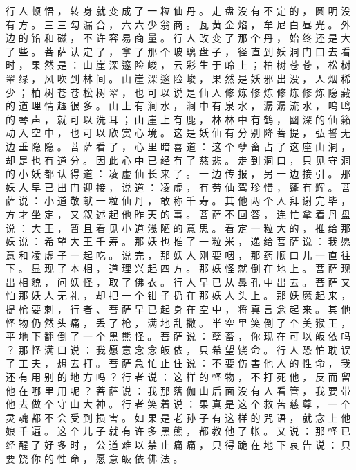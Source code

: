{行 人 顿 悟 ， 转 身 就 变 成 了 一 粒 仙 丹 。 走 盘 没 有 不 定 的 ， 圆 明 没 有 方 。
三 三 勾 漏 合 ， 六 六 少 翁 商 。
瓦 黄 金 焰 ， 牟 尼 白 昼 光 。
外 边 的 铅 和 磁 ， 不 许 容 易 商 量 。
行 人 改 变 了 那 个 丹 ， 始 终 还 是 大 了 些 。
菩 萨 认 定 了 ， 拿 了 那 个 玻 璃 盘 子 ， 径 直 到 妖 洞 门 口 去 看 时 ， 果 然 是 ： 山 崖 深 邃 险 峻 ， 云 彩 生 于 岭 上 ； 柏 树 苍 苍 ， 松 树 翠 绿 ， 风 吹 到 林 间 。
山 崖 深 邃 险 峻 ， 果 然 是 妖 邪 出 没 ， 人 烟 稀 少 ； 柏 树 苍 苍 松 树 翠 ， 也 可 以 说 是 仙 人 修 炼 修 炼 修 炼 修 炼 隐 藏 的 道 理 情 趣 很 多 。
山 上 有 涧 水 ， 涧 中 有 泉 水 ， 潺 潺 流 水 ， 呜 鸣 的 琴 声 ， 就 可 以 洗 耳 ； 山 崖 上 有 鹿 ， 林 林 中 有 鹤 ， 幽 深 的 仙 籁 动 入 空 中 ， 也 可 以 欣 赏 心 境 。
这 是 妖 仙 有 分 别 降 菩 提 ， 弘 誓 无 边 垂 隐 隐 。
菩 萨 看 了 ， 心 里 暗 喜 道 ： 这 个 孽 畜 占 了 这 座 山 洞 ， 却 是 也 有 道 分 。
因 此 心 中 已 经 有 了 慈 悲 。
走 到 洞 口 ， 只 见 守 洞 的 小 妖 都 认 得 道 ： 凌 虚 仙 长 来 了 。
一 边 传 报 ， 另 一 边 接 引 。
那 妖 人 早 已 出 门 迎 接 ， 说 道 ： 凌 虚 ， 有 劳 仙 驾 珍 惜 ， 蓬 有 辉 。
菩 萨 说 ： 小 道 敬 献 一 粒 仙 丹 ， 敢 称 千 寿 。
其 他 两 个 人 拜 谢 完 毕 ， 方 才 坐 定 ， 又 叙 述 起 他 昨 天 的 事 。
菩 萨 不 回 答 ， 连 忙 拿 着 丹 盘 说 ： 大 王 ， 暂 且 看 见 小 道 浅 陋 的 意 思 。
看 定 一 粒 大 的 ， 推 给 那 妖 说 ： 希 望 大 王 千 寿 。
那 妖 也 推 了 一 粒 米 ， 递 给 菩 萨 说 ： 我 愿 意 和 凌 虚 子 一 起 吃 。
说 完 ， 那 妖 人 刚 要 咽 ， 那 药 顺 口 儿 一 直 往 下 。
显 现 了 本 相 ， 道 理 兴 起 四 方 。
那 妖 怪 就 倒 在 地 上 。
菩 萨 现 出 相 貌 ， 问 妖 怪 ， 取 了 佛 衣 。
行 人 早 已 从 鼻 孔 中 出 去 。
菩 萨 又 怕 那 妖 人 无 礼 ， 却 把 一 个 钳 子 扔 在 那 妖 人 头 上 。
那 妖 魔 起 来 ， 提 枪 要 刺 ， 行 者 、 菩 萨 早 已 起 身 在 空 中 ， 将 真 言 念 起 来 。
其 他 怪 物 仍 然 头 痛 ， 丢 了 枪 ， 满 地 乱 撒 。
半 空 里 笑 倒 了 个 美 猴 王 ， 平 地 下 翻 倒 了 一 个 黑 熊 怪 。
菩 萨 说 ： 孽 畜 ， 你 现 在 可 以 皈 依 吗 ？ 那 怪 满 口 说 ： 我 愿 意 念 念 皈 依 ， 只 希 望 饶 命 。
行 人 恐 怕 耽 误 了 工 夫 ， 想 去 打 。
菩 萨 急 忙 止 住 说 ： 不 要 伤 害 他 人 的 性 命 ， 我 还 有 用 别 的 地 方 吗 ？
行 者 说 ： 这 样 的 怪 物 ， 不 打 死 他 ， 反 而 留 他 在 哪 里 用 呢 ？ 菩 萨 说 ： 我 那 落 伽 山 后 面 没 有 人 看 管 ， 我 要 带 他 去 做 个 守 山 大 神 。
行 者 笑 着 说 ： 果 真 是 这 个 救 苦 慈 尊 ， 一 个 灵 魂 都 不 会 受 到 损 害 。
如 果 是 老 孙 子 有 这 样 的 咒 语 ， 就 念 上 他 娘 千 遍 。
这 个 儿 子 就 有 许 多 黑 熊 ， 都 教 他 了 帐 。
又 说 ： 那 怪 已 经 醒 了 好 多 时 ， 公 道 难 以 禁 止 痛 痛 ， 只 得 跪 在 地 下 哀 告 说 ： 只 要 饶 你 的 性 命 ， 愿 意 皈 依 佛 法 。
}
